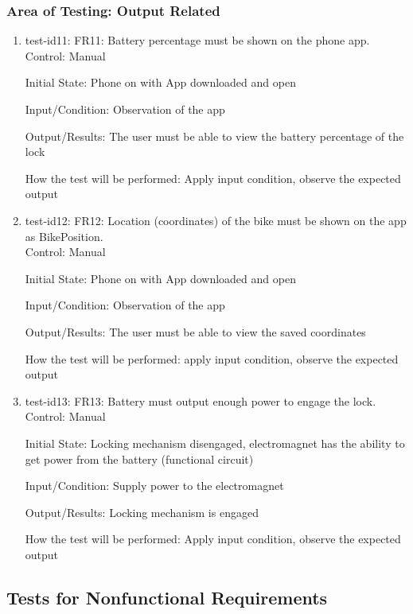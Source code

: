 \documentclass[12pt, titlepage]{article}
\begin{document}
\subsubsection{Area of Testing: Output Related}

\begin{enumerate}

\item{test-id11: FR11: Battery percentage must be shown on the phone app. \\}
Control: Manual 

Initial State: Phone on with App downloaded and open 

Input/Condition: Observation of the app 

Output/Results: The user must be able to view the battery percentage of the lock 

How the test will be performed: Apply input condition, observe the expected output

\item{test-id12: FR12: Location (coordinates) of the bike must be shown on the app as BikePosition. \\}
Control: Manual 

Initial State: Phone on with App downloaded and open 

Input/Condition: Observation of the app 

Output/Results: The user must be able to view the saved coordinates 

How the test will be performed: apply input condition, observe the expected output

\item{test-id13: FR13: Battery must output enough power to engage the lock. \\}
Control: Manual 

Initial State: Locking mechanism disengaged, electromagnet has the ability to get power from the battery (functional circuit) 

Input/Condition: Supply power to the electromagnet 

Output/Results: Locking mechanism is engaged 

How the test will be performed: Apply input condition, observe the expected output

\end{enumerate}

\subsection{Tests for Nonfunctional Requirements}
\label{Section 5.2}
\end{document}
